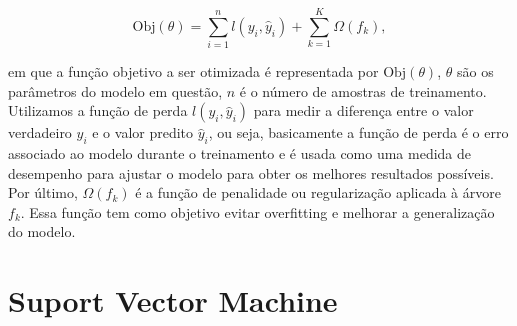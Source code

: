 \documentclass[12pt,oneside,a4paper,chapter=TITLE,
			   english,brazil]{abntex2}
\begin{document}
\begin{equation}
    \text{Obj}(\theta) = \sum_{i=1}^{n} l(y_i, \hat{y}_i) + \sum_{k=1}^{K} \Omega(f_k),
\end{equation}




  


\noindent em que a função objetivo a ser otimizada é representada por $\text{Obj}(\theta)$, $\theta$ são os parâmetros do modelo em questão,  $n$ é o número de amostras de treinamento. Utilizamos a função de perda $l(y_i, \hat{y}_i)$ para medir a diferença entre o valor verdadeiro $y_i$ e o valor predito $\hat{y}_i$, ou seja, basicamente a função de perda é o erro associado ao modelo durante o treinamento e é usada como uma medida de desempenho para ajustar o modelo para obter os melhores resultados possíveis. Por último, \(\Omega(f_k)\) é a função de penalidade ou regularização aplicada à árvore \(f_k\). Essa função tem como objetivo evitar overfitting e melhorar a generalização do modelo.




\vspace{\onelineskip}

\section{Suport Vector Machine}

\vspace{\onelineskip}
\end{document}
